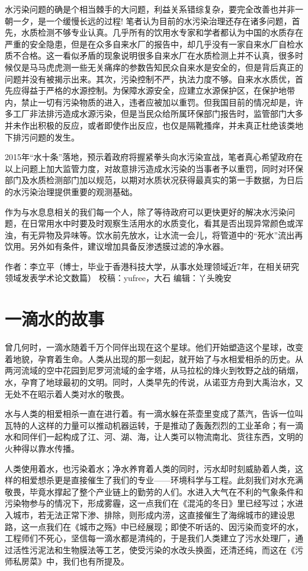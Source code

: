 \documentclass[
]{book}
\begin{document}
水污染问题的确是个相当棘手的大问题，利益关系错综复杂，要完全改善也并非一朝一夕，是一个缓慢长远的过程! 笔者认为目前的水污染治理还存在诸多问题，首先，水质检测不够专业认真。几乎所有的饮用水专家和学者都认为中国的水质存在严重的安全隐患，但是在众多自来水厂的报告中，却几乎没有一家自来水厂自检水质不合格。这一看似矛盾的现象说明很多自来水厂在水质检测上并不认真，很多时候仅是马马虎虎测一些无关痛痒的参数告知民众自来水是安全的，但是背后真正的问题并没有被揭示出来。其次，污染控制不严，执法力度不够。自来水水质优，首先应得益于严格的水源控制。为保障水源安全，应建立水源保护区，在保护地带内，禁止一切有污染物质的进入，违者应被加以重罚。但我国目前的情况却是，许多工厂非法排污造成水源污染，但是当民众给所属环保部门报告时，监管部门大多并未作出积极的反应，或者即使作出反应，也仅是隔靴搔痒，并未真正杜绝该类地下排污问题的发生。

2015年``水十条''落地，预示着政府将握紧拳头向水污染宣战，笔者真心希望政府在以上问题上加大监管力度，对故意排污造成水污染的当事者予以重罚，同时对环保部门及水质检测部门加以规范，以期对水质状况获得最真实的第一手数据，为日后的水污染治理提供重要的观测基础。

作为与水息息相关的我们每一个人，除了等待政府可以更快更好的解决水污染问题，在日常用水中时要及时观察生活用水的水质变化，看其是否出现异常颜色或浑浊，有无异物及异味等。饮水前先放水，让水流一会儿，将管道中的``死水''流出再饮用。另外如有条件，建议增加具备反渗透膜过滤的净水器。

作者：李立平（博士，毕业于香港科技大学，从事水处理领域近7年，在相关研究领域发表学术论文数篇）
校稿：yufree，大石
编辑：丫头晚安

\hypertarget{ux4e00ux6ef4ux6c34ux7684ux6545ux4e8b}{%
\section{一滴水的故事}\label{ux4e00ux6ef4ux6c34ux7684ux6545ux4e8b}}

曾几何时，一滴水随着千万个同伴出现在这个星球。他们开始塑造这个星球，改变着地貌，孕育着生命。人类从出现的那一刻起，就开始了与水相爱相杀的历史。从两河流域的空中花园到尼罗河流域的金字塔，从马拉松的烽火到牧野之战的硝烟，水，孕育了地球最初的文明。同时，人类早先的传说，从诺亚方舟到大禹治水，又无处不在昭示着人类对水的敬畏。

水与人类的相爱相杀一直在进行着。有一滴水躲在茶壶里变成了蒸汽，告诉一位叫瓦特的人这样的力量可以推动机器运转，于是推动了轰轰烈烈的工业革命；有一滴水和同伴们一起构成了江、河、湖、海，让人类可以物流南北、货往东西，文明的火种得以靠水传播。

人类使用着水，也污染着水；净水养育着人类的同时，污水却时刻威胁着人类，这样的相爱想杀更是直接催生了我们的专业------环境科学与工程。此刻我们对水充满敬畏，毕竟水撑起了整个产业链上的勤劳的人们。水进入大气在不利的气象条件和污染物参与的情况下，形成雾霾，这一点我们在《混沌的冬日》里已经写过；水进入城市，若无法正常下渗、排除，则形成内涝，这直接催生了海绵城市的建设思路，这一点我们在《城市之殇》中已经展现；即使不听话的、因污染而变坏的水，工程师们不死心，坚信每一滴水都是清纯的，于是我们人类建立了污水处理厂，通过活性污泥法和生物膜法等工艺，使受污染的水改头换面，还清还纯，而这在《污师私房菜》中，我们也有所提及。
\end{document}
